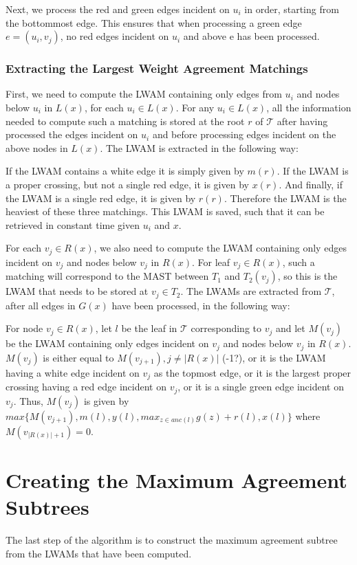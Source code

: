 Next, we process the red and green edges incident on $u_i$ in order, starting from the bottommost edge. This ensures that when processing a green edge $e=(u_i,v_j)$, no red edges incident on $u_i$ and above e has been processed.

\subsubsection{Extracting the Largest Weight Agreement Matchings}
First, we need to compute the LWAM containing only edges from $u_i$ and nodes below $u_i$ in $L(x)$, for each $u_i \in L(x)$. For any $u_i \in L(x)$, all the information needed to compute such a matching is stored at the root $r$ of $\mathcal{T}$ after having processed the edges incident on $u_i$ and before processing edges incident on the above nodes in $L(x)$. The LWAM is extracted in the following way:

If the LWAM contains a white edge it is simply given by $m(r)$. If the LWAM is a proper crossing, but not a single red edge, it is given by $x(r)$. And finally, if the LWAM is a single red edge, it is given by $r(r)$. Therefore the LWAM is the heaviest of these three matchings. This LWAM is saved, such that it can be retrieved in constant time given $u_i$ and $x$.

For each $v_j \in R(x)$, we also need to compute the LWAM containing only edges incident on $v_j$ and nodes below $v_j$ in $R(x)$. For leaf $v_j \in R(x)$, such a matching will correspond to the MAST between $T_1$ and $T_2(v_j)$, so this is the LWAM that needs to be stored at $v_j \in T_2$. The LWAMs are extracted from $\mathcal{T}$, after all edges in $G(x)$ have been processed, in the following way:

For node $v_j \in R(x)$, let $l$ be the leaf in $\mathcal{T}$ corresponding to $v_j$ and let $M(v_j)$ be the LWAM containing only edges incident on $v_j$ and nodes below $v_j$ in $R(x)$. $M(v_j)$ is either equal to $M(v_{j+1}), j \ne |R(x)|$ (-1?), or it is the LWAM having a white edge incident on $v_j$ as the topmost edge, or it is the largest proper crossing having a red edge incident on $v_j$, or it is a single green edge incident on $v_j$. Thus, $M(v_j)$ is given by $max\{M(v_{j+1}), m(l), y(l), max_{z \in anc(l)}g(z) + r(l), x(l)\}$ where $M(v_{|R(x)|+1}) = 0$.

\section{Creating the Maximum Agreement Subtrees}
The last step of the algorithm is to construct the maximum agreement subtree from the LWAMs that have been computed.

